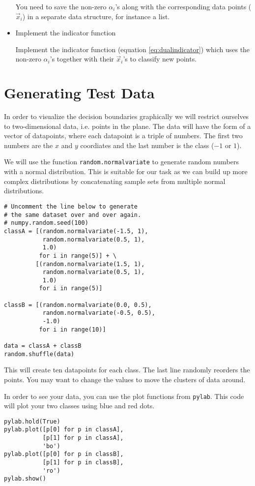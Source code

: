 \documentclass{article}
\begin{document}
\begin{itemize}
  You need to save the non-zero \(\alpha_i\)'s along with the
  corresponding data points (\(\vec{x}_i\)) in a separate data
  structure, for instance a list.

\item Implement the indicator function

  Implement the indicator function (equation \ref{eq:dualindicator}) which
  uses the non-zero \(\alpha_i\)'s together with their \(\vec{x}_i\)'s
  to classify new points.

\end{itemize}


\section{Generating Test Data}

In order to visualize the decision boundaries graphically we will
restrict ourselves to two-dimensional data, i.e. points in the plane.
The data will have the form of a vector of datapoints, where each
datapoint is a triple of numbers.  The first two numbers are the \(x\)
and \(y\) coordiates and the last number is the class (\(-1\) or
\(1\)).

We will use the function \texttt{random.normalvariate} to generate random
numbers with a normal distribution.  This is suitable for our task as
we can build up more complex distributions by concatenating sample
sets from multiple normal distributions.

\begin{lstlisting}
# Uncomment the line below to generate 
# the same dataset over and over again.
# numpy.random.seed(100)
classA = [(random.normalvariate(-1.5, 1),
           random.normalvariate(0.5, 1),
           1.0)
          for i in range(5)] + \
         [(random.normalvariate(1.5, 1),
           random.normalvariate(0.5, 1),
           1.0)
          for i in range(5)]

classB = [(random.normalvariate(0.0, 0.5),
           random.normalvariate(-0.5, 0.5),
           -1.0)
          for i in range(10)]

data = classA + classB
random.shuffle(data)
\end{lstlisting}
This will create ten datapoints for each class.  The last line randomly reorders
the points.  You may want to change the values to move the clusters of data
around.

In order to see your data, you can use the plot functions from \texttt{pylab}.
This code will plot your two classes using blue and red dots.
\begin{lstlisting}
pylab.hold(True)
pylab.plot([p[0] for p in classA],
           [p[1] for p in classA],
           'bo')
pylab.plot([p[0] for p in classB],
           [p[1] for p in classB],
           'ro')
pylab.show()
\end{lstlisting}
\end{document}
